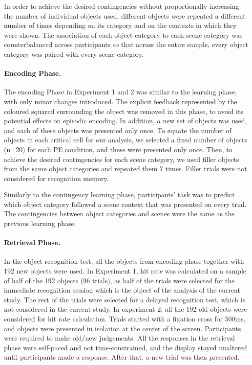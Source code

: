 \documentclass[a4paper,12pt]{article}
\begin{document}
In order to achieve the desired contingencies without proportionally increasing the number of individual objects used, different objects were repeated a different number of times depending on its category and on the contexts in which they were shown. The association of each object category to each scene category was counterbalanced across participants so that across the entire sample, every object category was paired with every scene category.
\paragraph{Encoding Phase.}
The encoding Phase in Experiment 1 and 2 was similar to the learning phase, with only minor changes introduced. The explicit feedback represented by the coloured squared surrounding the object was removed in this phase, to avoid its potential effects on episodic encoding. In addition, a new set of objects was used, and each of these objects was presented only once. To equate the number of objects in each critical cell for our analysis, we selected a fixed number of objects (n=20) for each PE condition, and these were presented only once. Then, to achieve the desired contingencies for each scene category, we used filler objects from the same object categories and repeated them 7 times. Filler trials were not considered for recognition memory. \par
Similarly to the contingency learning phase, participants' task was to predict which object category followed a scene context that was presented on every trial. The contingencies between object categories and scenes were the same as the previous learning phase. 
\paragraph{Retrieval Phase.}
In the object recognition test, all the objects from encoding phase together with 192 new objects were used. 
In Experiment 1, hit rate was calculated on a sample of half of the 192 objects (96 trials), as half of the trials were selected for the immediate recognition session which is the object of the analysis of the current study. The rest of the trials were selected for a delayed recognition test, which is not considered in the current study. In experiment 2, all the 192 old objects were considered for hit rate calculation. Trials started with a fixation cross for 500ms, and objects were presented in isolation at the center of the screen. Participants were required to make old/new judgements. All the responses in the retrieval phase were self-paced and not time-constrained, and the display stayed unaltered until participants made a response. After that, a new trial was then presented.
\end{document}
